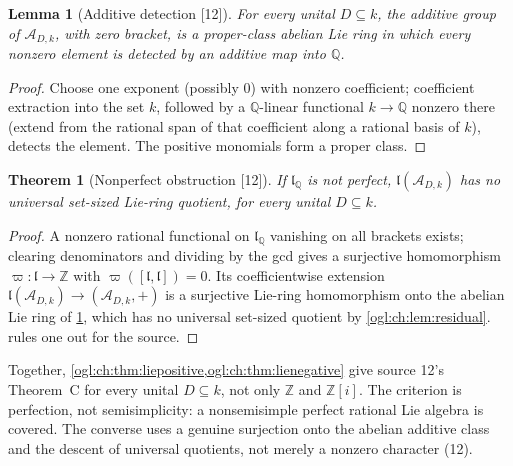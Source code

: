 \documentclass[11pt,oneside]{article}
\numberwithin{equation}{section}
\newtheorem{theorem}{Theorem}[section]
\newtheorem{lemma}[lemma]{Lemma}
\theoremstyle{definition}
\theoremstyle{remark}
\newcommand{\Z}{\mathbb Z}
\newcommand{\Q}{\mathbb Q}
\newcommand{\A}{\mathcal A}
\newcommand{\src}[1]{\textup{\textsf{\small[#1]}}}
\begin{document}
\begin{lemma}[Additive detection \src{12}]\label{ogl:ch:lem:additive}
For every unital $D\subseteq k$, the additive group of $\A_{D,k}$, with zero
bracket, is a proper-class abelian Lie ring in which every nonzero element is
detected by an additive map into $\Q$.
\end{lemma}
\begin{proof}
Choose one exponent (possibly $0$) with nonzero coefficient; coefficient
extraction into the set $k$, followed by a $\Q$-linear functional $k\to\Q$
nonzero there (extend from the rational span of that coefficient along a
rational basis of $k$), detects the element. The positive monomials form a
proper class.
\end{proof}

\begin{theorem}[Nonperfect obstruction \src{12}]\label{ogl:ch:thm:lienegative}
If $\mathfrak l_\Q$ is not perfect, $\mathfrak l(\A_{D,k})$ has no universal set-sized
Lie-ring quotient, for every unital $D\subseteq k$.
\end{theorem}
\begin{proof}
A nonzero rational functional on $\mathfrak l_\Q$ vanishing on all brackets
exists; clearing denominators and dividing by the gcd gives a surjective
homomorphism $\varpi:\mathfrak l\to\Z$ with $\varpi([\mathfrak l,\mathfrak l])=0$.
Its coefficientwise extension $\mathfrak l(\A_{D,k})\to(\A_{D,k},+)$ is a
surjective Lie-ring homomorphism onto the abelian Lie ring of
\cref{ogl:ch:lem:additive}, which has no universal set-sized quotient by
\cref{ogl:ch:lem:residual}.  rules one out for the
source.
\end{proof}

Together, \cref{ogl:ch:thm:liepositive,ogl:ch:thm:lienegative} give source 12's
Theorem~C for every unital $D\subseteq k$, not only $\Z$ and $\Z[i]$. The
criterion is perfection, not semisimplicity: a nonsemisimple perfect rational
Lie algebra is covered. The converse uses a genuine surjection onto the abelian
additive class and the descent of universal quotients, not merely a nonzero
character (12).
\end{document}
